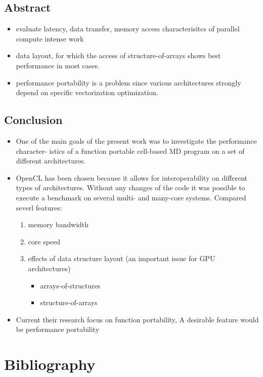 \documentclass[11pt]{article}
\begin{document}
\subsection{Abstract}
\label{sec-12-1}
\begin{itemize}
\item evaluate latency, data transfer, memory access characterisitcs of parallel compute intense work
\item data layout, for which the access of structure-of-arrays shows best performance in most cases.
\item performance portability is a problem since various architectures strongly depend on specific vectorization optimization.
\end{itemize}

\subsection{Conclusion}
\label{sec-12-2}
\begin{itemize}
\item One of the main goals of the present work was to investigate the performance character- istics of a function portable cell-based MD program on a set of different architectures.
\item OpenCL has been chosen because it allows for interoperability on different types of architectures. Without any changes of the code it was possible to execute a benchmark on several multi- and many-core systems. Compared severl features:
\begin{enumerate}
\item memory bandwidth
\item core speed
\item effects of data structure layout (an important issue for GPU architectures)
\begin{itemize}
\item arrays-of-structures
\item structure-of-arrays
\end{itemize}
\end{enumerate}
\item Current their research focus on function portability, A desirable feature would be performance portability
\end{itemize}

\section{Bibliography}
\label{sec-13}

 
\end{document}
